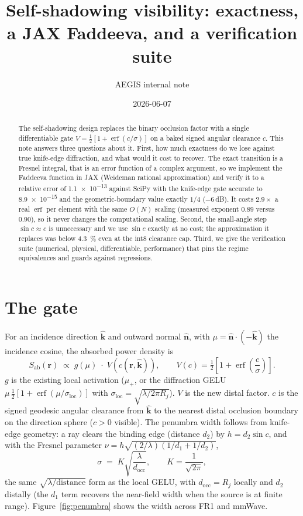 \documentclass[11pt]{article}
\title{Self-shadowing visibility: exactness, a JAX Faddeeva, and a verification suite}
\author{AEGIS internal note}
\date{2026-06-07}
\newcommand{\Sab}{S_{\mathrm{ab}}}
\newcommand{\nhat}{\hat{\mathbf{n}}}
\newcommand{\khat}{\hat{\mathbf{k}}}
\newcommand{\erf}{\ensuremath{\operatorname{erf}}}
\begin{document}
\maketitle

\begin{abstract}
The self-shadowing design replaces the binary occlusion factor with a single
differentiable gate $V=\tfrac12[1+\erf(c/\sigma)]$ on a baked signed angular
clearance $c$. This note answers three questions about it. First, how much
exactness do we lose against true knife-edge diffraction, and what would it cost
to recover. The exact transition is a Fresnel integral, that is an error
function of a complex argument, so we implement the Faddeeva function in JAX
(Weideman rational approximation) and verify it to a relative error of
\num{1.1e-13} against SciPy with the knife-edge gate accurate to \num{8.9e-15}
and the geometric-boundary value exactly $1/4$ ($-6$\,dB). It costs
$2.9\times$ a real \erf{} per element with the same $O(N)$ scaling
(measured exponent $0.89$ versus $0.90$), so it never changes the computational
scaling. Second, the small-angle step $\sin c\approx c$ is unnecessary and we
use $\sin c$ exactly at no cost; the approximation it replaces was below
\SI{4.3}{\percent} even at the int8 clearance cap. Third, we give the
verification suite (numerical, physical, differentiable, performance) that pins
the regime equivalences and guards against regressions.
\end{abstract}

\section{The gate}

For an incidence direction $\khat$ and outward normal $\nhat$, with
$\mu=\nhat\cdot(-\khat)$ the incidence cosine, the absorbed power density is
\begin{equation}
  \Sab(\mathbf{r}) \;\propto\; g(\mu)\;\cdot\;V\!\left(c(\mathbf{r},\khat)\right),
  \qquad
  V(c)=\tfrac12\!\left[1+\erf\!\left(\frac{c}{\sigma}\right)\right].
  \label{eq:gate}
\end{equation}
$g$ is the existing local activation ($\mu_+$, or the diffraction GELU
$\mu\,\tfrac12[1+\erf(\mu/\sigma_{\mathrm{loc}})]$ with
$\sigma_{\mathrm{loc}}=\sqrt{\lambda/2\pi R_j}$). $V$ is the new distal factor.
$c$ is the signed geodesic angular clearance from $\khat$ to the nearest distal
occlusion boundary on the direction sphere ($c>0$ visible). The penumbra width
follows from knife-edge geometry: a ray clears the binding edge (distance $d_2$)
by $h=d_2\sin c$, and with the Fresnel parameter
$\nu=h\sqrt{(2/\lambda)(1/d_1+1/d_2)}$,
\begin{equation}
  \sigma \;=\; K\sqrt{\frac{\lambda}{d_{\mathrm{occ}}}},\qquad
  K=\frac{1}{\sqrt{2\pi}},
  \label{eq:sigma}
\end{equation}
the same $\sqrt{\lambda/\text{distance}}$ form as the local GELU, with
$d_{\mathrm{occ}}=R_j$ locally and $d_2$ distally (the $d_1$ term recovers the
near-field width when the source is at finite range). Figure~\ref{fig:penumbra}
shows the width across FR1 and mmWave.
\end{document}
